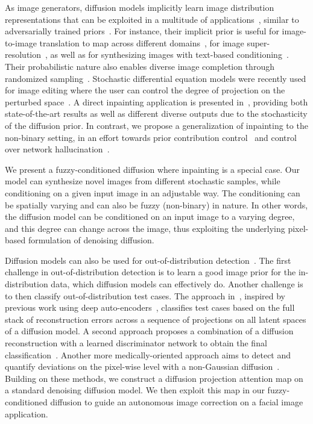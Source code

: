 \documentclass{article}
\begin{document}
As image generators, diffusion models implicitly learn image distribution representations that can be exploited in a multitude of applications~\cite{chung2022diffusion}, similar to adversarially trained priors~\cite{el2022bigprior}. For instance, their implicit prior is useful for image-to-image translation to map across different domains~\cite{sasaki2021unit,saharia2022palette}, for image super-resolution~\cite{saharia2022image}, as well as for synthesizing images with text-based conditioning~\cite{saharia2022photorealistic}. Their probabilistic nature also enables diverse image completion through randomized sampling~\cite{horita2022structure}. Stochastic differential equation models were recently used for image editing where the user can control the degree of projection on the perturbed space~\cite{meng2021sdedit}. A direct inpainting application is presented in~\cite{lugmayr2022repaint}, providing both state-of-the-art results as well as different diverse outputs due to the stochasticity of the diffusion prior. In contrast, we propose a generalization of inpainting to the non-binary setting, in an effort towards prior contribution control~\cite{el2020blind,el2022bigprior} and control over network hallucination~\cite{el2021deep}. 

We present a fuzzy-conditioned diffusion where inpainting is a special case. Our model can synthesize novel images from different stochastic samples, while conditioning on a given input image in an adjustable way. The conditioning can be spatially varying and can also be fuzzy (non-binary) in nature. In other words, the diffusion model can be conditioned on an input image to a varying degree, and this degree can change across the image, thus exploiting the underlying pixel-based formulation of denoising diffusion. 

Diffusion models can also be used for out-of-distribution detection~\cite{liu2022diffusion,wyatt2022anoddpm,graham2022denoising}. The first challenge in out-of-distribution detection is to learn a good image prior for the in-distribution data, which diffusion models can effectively do. Another challenge is to then classify out-of-distribution test cases. The approach in~\cite{graham2022denoising}, inspired by previous work using deep auto-encoders~\cite{gong2019memorizing}, classifies test cases based on the full stack of reconstruction errors across a sequence of projections on all latent spaces of a diffusion model. A second approach proposes a combination of a diffusion reconstruction with a learned discriminator network to obtain the final classification~\cite{liu2022diffusion}. Another more medically-oriented approach aims to detect and quantify deviations on the pixel-wise level with a non-Gaussian diffusion~\cite{wyatt2022anoddpm}. Building on these methods, we construct a diffusion projection attention map on a standard denoising diffusion model. We then exploit this map in our fuzzy-conditioned diffusion to guide an autonomous image correction on a facial image application. 
\end{document}
